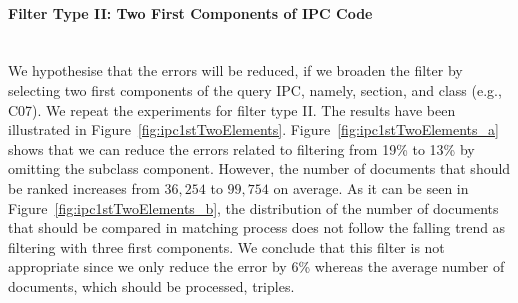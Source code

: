 \paragraph{Filter Type II: Two First Components of IPC Code}
\ \\
We hypothesise that the errors will be reduced, if we broaden the filter by selecting two first components of the query IPC, namely, section, and class (e.g., C07). We repeat the experiments for filter type II.
The results have been illustrated in Figure~\ref{fig:ipc1stTwoElements}. Figure~\ref{fig:ipc1stTwoElements_a} shows that we can reduce the errors related to filtering from 19\% to 13\% by omitting the subclass component. However, the number of documents that should be ranked increases from $ 36,254 $ to $ 99,754 $ on average. As it can be seen in Figure~\ref{fig:ipc1stTwoElements_b}, the distribution of the number of documents that should be compared in matching process does not follow the falling trend as filtering with three first components. We conclude that this filter is not appropriate since we only reduce the error by 6\% whereas the average number of documents, which should be processed, triples.    
